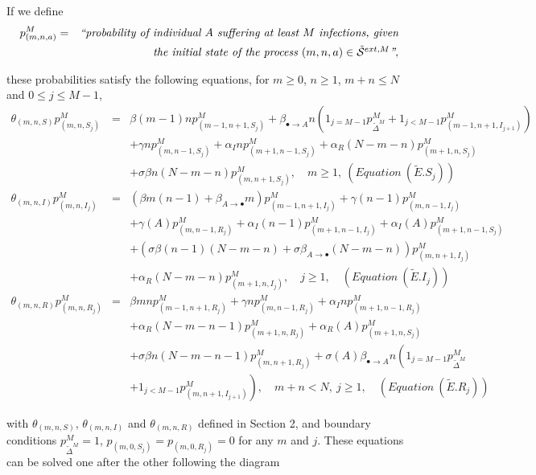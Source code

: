 \documentclass[preprint,12pt]{elsarticle}
\begin{document}
\par If we define
\begin{eqnarray*}
 p^M_{(m,n,a)} &=& \hbox{\it ``probability of individual $A$ suffering at least $M$ infections, given}\\
&& \hbox{\it the initial state of the process $(m,n,a)\in{\cal \tilde S}^{ext,M}$''},
\end{eqnarray*}
\par\noindent these probabilities satisfy the following equations, for $m\geq0$, $n\geq1$, $m+n\leq N$ and $0\leq j\leq M-1$,
\begin{eqnarray*}
 \theta_{(m,n,S)}p^M_{(m,n,S_j)} &=& \beta(m-1)np^M_{(m-1,n+1,S_j)}+\beta_{\bullet\rightarrow A}n\left(1_{j=M-1}p^M_{{\tilde \Delta}^M}+1_{j<M-1}p^M_{(m-1,n+1,I_{j+1})}\right)\\
&&+\gamma np^M_{(m,n-1,S_j)}+\alpha_I np^M_{(m+1,n-1,S_j)}+\alpha_R(N-m-n)p^M_{(m+1,n,S_j)}\\
&&+\sigma\beta n(N-m-n)p^M_{(m,n+1,S_j)},\quad m\geq1,\ (Equation\ ({\tilde E}.S_j))\\
 \theta_{(m,n,I)}p^M_{(m,n,I_j)} &=& \left(\beta m(n-1)+\beta_{A\rightarrow\bullet}m\right)p^M_{(m-1,n+1,I_j)}+\gamma(n-1)p^M_{(m,n-1,I_j)}\\
&&+\gamma(A)p^M_{(m,n-1,R_j)}+\alpha_I(n-1)p^M_{(m+1,n-1,I_j)}+\alpha_I(A)p^M_{(m+1,n-1,S_j)}\\
&&+\left(\sigma\beta(n-1)(N-m-n)+\sigma\beta_{A\rightarrow\bullet}(N-m-n)\right)p^M_{(m,n+1,I_j)}\\
&& +\alpha_R(N-m-n)p^M_{(m+1,n,I_j)},\quad j\geq1,\quad (Equation\ ({\tilde E}.I_j))\\
 \theta_{(m,n,R)}p^M_{(m,n,R_j)} &=& \beta mnp^M_{(m-1,n+1,R_j)}+\gamma np^M_{(m,n-1,R_j)}+\alpha_I np^M_{(m+1,n-1,R_j)}\\
&&+\alpha_R(N-m-n-1)p^M_{(m+1,n,R_j)}+\alpha_R(A)p^M_{(m+1,n,S_j)}\\
&&+\sigma\beta n(N-m-n-1)p^M_{(m,n+1,R_j)}+\sigma(A)\beta_{\bullet\rightarrow A}n\left(1_{j=M-1}p^M_{{\tilde \Delta}^M}\right.\\
&&\left.+1_{j<M-1}p^M_{(m,n+1,I_{j+1})}\right),\quad m+n<N,\ j\geq1,\quad (Equation\ ({\tilde E}.R_j))
\end{eqnarray*}
\par\noindent with $\theta_{(m,n,S)}$, $\theta_{(m,n,I)}$ and $\theta_{(m,n,R)}$ defined in Section 2, and boundary conditions
$p^M_{{\tilde \Delta}^M}=1$, $p_{(m,0,S_j)}=p_{(m,0,R_j)}=0$ for any $m$ and $j$. These equations can be solved one after the other following the diagram
\end{document}
